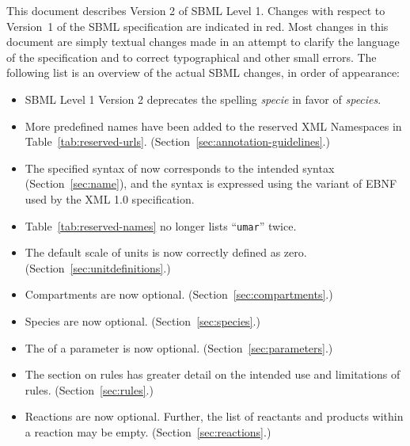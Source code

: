 \documentclass[10pt]{cekarticle}
\newcommand{\vref}[1]{\ref{#1}}
\newenvironment{blockChanged}{\color{BrickRed}}{}
\begin{document}
\begin{blockChanged}
  This document describes Version 2 of SBML Level 1.  Changes with respect
  to Version~1 of the SBML specification are indicated in red.  Most
  changes in this document are simply textual changes made in an attempt to
  clarify the language of the specification and to correct typographical
  and other small errors.  The following list is an overview of the actual
  SBML changes, in order of appearance:
\vspace*{-0.75ex}\begin{itemize}\setlength{\parskip}{0.6ex}
  
\item SBML Level 1 Version 2 deprecates the spelling \emph{specie} 
  in favor of \emph{species}.
  
\item More predefined names have been added to the reserved XML Namespaces
      in Table~\ref{tab:reserved-urls}. (Section~\ref{sec:annotation-guidelines}.)

\item The specified syntax of  now corresponds to the intended
  syntax (Section~\ref{sec:name}), and the syntax is expressed using the
  variant of EBNF used by the XML 1.0 specification.

\item Table~\vref{tab:reserved-names} no longer lists ``\texttt{umar}'' twice.

\item The default scale of units is now correctly defined as zero.
  (Section~\ref{sec:unitdefinitions}.)

\item Compartments are now optional.  (Section~\ref{sec:compartments}.)

\item Species are now optional.  (Section~\ref{sec:species}.)

\item The  of a parameter is now optional.
  (Section~\ref{sec:parameters}.)
  
\item The section on rules has greater detail on the intended use and
  limitations of rules.  (Section~\ref{sec:rules}.)
  
\item Reactions are now optional.  Further, the list of reactants and
  products within a reaction may be empty.  (Section~\ref{sec:reactions}.)
  

\end{itemize}
\end{blockChanged}
\end{document}

